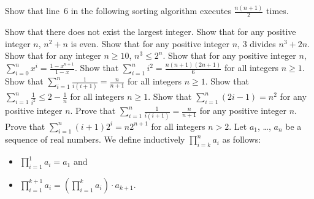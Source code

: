 \begin{exercise}
\label{exercise:selection-sort}
    Show that line~6 in the following sorting algorithm executes
    $\frac{n (n + 1)}{2}$ times.

\end{exercise}
\begin{chapterendexercises}
    \exercise Show that there does not exist the largest integer.
    \exercise[recommended] Show that for any positive integer $n$, $n^2 + n$ is even.
    \exercise Show that for any positive integer $n$, $3$ divides
        $n^3 + 2n$.
    \exercise Show that for any integer $n \ge 10$,
        $n^3 \le 2^n$.
    \exercise Show that for any positive integer $n$,
        $\sum_{i = 0}^n x^i = \frac{1 - x^{n + 1}}{1 - x}$.
    \exercise[recommended] Show that $\sum_{i = 1}^n i^2 =
        \frac{n (n + 1)(2n + 1)}{6}$ for all integers $n \ge 1$.
    \exercise Show that $\sum_{i = 1}^n \frac{1}{i (i + 1)} =
        \frac{n}{n + 1}$ for all integers $n \ge 1$.
    \exercise Show that $\sum_{i = 1}^n \frac{1}{i^2} \le
        2 - \frac{1}{n}$ for all integers $n \ge 1$.
    \exercise Show that $\sum_{i = 1}^n (2i - 1) = n^2$ for any positive
        integer $n$.
    \exercise Prove that $\sum_{i = 1}^n \frac{1}{i (i + 1)} =
        \frac{n}{n + 1}$ for any positive integer $n$.
    \exercise Prove that $\sum_{i = 1}^n (i + 1) 2^i = n 2^{n + 1}$
        for all integers $n > 2$.
    \exercise Let $a_1$, \dots, $a_n$ be a sequence of real numbers.
        We define inductively
        $\prod_{i = k}^n a_i$ as follows:
        \begin{itemize}
            \item $\prod_{i = 1}^1 a_i = a_1$ and
            \item $\prod_{i = 1}^{k + 1} a_i =
                \left( \prod_{i = 1}^k a_i \right) \cdot a_{k + 1}$.
        \end{itemize}


\end{chapterendexercises}
